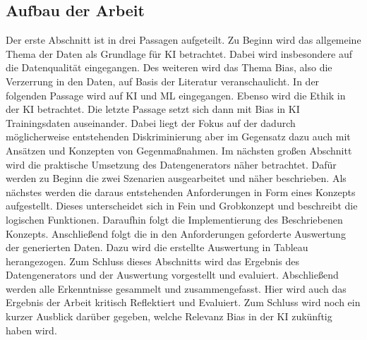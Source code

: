 \begin{onehalfspace}
        \newpage
        \section{Aufbau der Arbeit}
        \label{subsec:aufbau der arbeit}
            Der erste Abschnitt ist in drei Passagen aufgeteilt. Zu Beginn wird das allgemeine Thema der Daten als Grundlage für \ac*{KI} betrachtet. Dabei wird insbesondere auf die Datenqualität eingegangen. Des weiteren wird das Thema Bias, also die Verzerrung in den Daten, auf Basis der Literatur veranschaulicht. In der folgenden Passage wird auf \ac*{KI} und \ac{ML} eingegangen. Ebenso wird die Ethik in der \ac*{KI} betrachtet. Die letzte Passage setzt sich dann mit Bias in \ac*{KI} Trainingsdaten auseinander. Dabei liegt der Fokus auf der dadurch möglicherweise entstehenden Diskriminierung aber im Gegensatz dazu auch mit Ansätzen und Konzepten von Gegenmaßnahmen.
            Im nächsten großen Abschnitt wird die praktische Umsetzung des Datengenerators näher betrachtet. Dafür werden zu Beginn die zwei Szenarien ausgearbeitet und näher beschrieben. Als nächstes werden die daraus entstehenden Anforderungen in Form eines Konzepts aufgestellt. Dieses unterscheidet sich in Fein und Grobkonzept und beschreibt die logischen Funktionen. Daraufhin folgt die Implementierung des Beschriebenen Konzepts. Anschließend folgt die in den Anforderungen geforderte Auswertung der generierten Daten. Dazu wird die erstellte Auswertung in Tableau herangezogen. Zum Schluss dieses Abschnitts wird das Ergebnis des Datengenerators und der Auswertung vorgestellt und evaluiert.
            Abschließend werden alle Erkenntnisse gesammelt und zusammengefasst. Hier wird auch das Ergebnis der Arbeit kritisch Reflektiert und Evaluiert. Zum Schluss wird noch ein kurzer Ausblick darüber gegeben, welche Relevanz Bias in der \ac*{KI} zukünftig haben wird. 
        
        \newpage
    \end{onehalfspace}